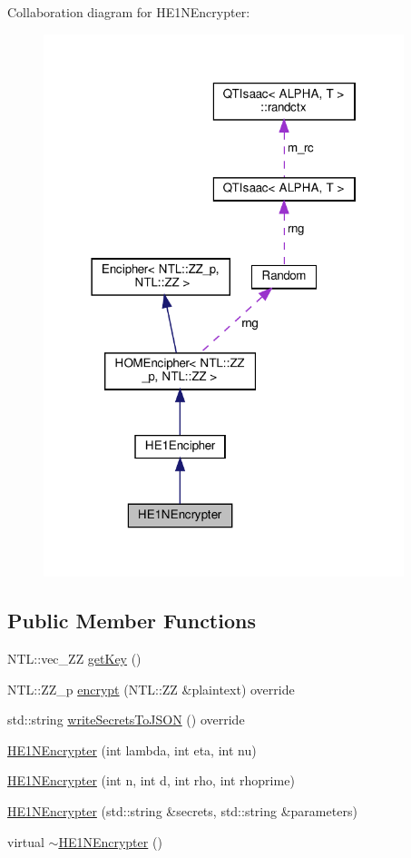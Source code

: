 Collaboration diagram for H\+E1\+N\+Encrypter\+:\nopagebreak
\begin{figure}[H]
\begin{center}
\leavevmode
\includegraphics[width=298pt]{classHE1NEncrypter__coll__graph}
\end{center}
\end{figure}
\subsection*{Public Member Functions}
\begin{DoxyCompactItemize}
\item 
N\+T\+L\+::vec\+\_\+\+ZZ \hyperlink{classHE1NEncrypter_a68735a56be50d13e04824e48a61fc2f8}{get\+Key} ()
\item 
N\+T\+L\+::\+Z\+Z\+\_\+p \hyperlink{classHE1NEncrypter_a9a9c76558466ac56093cb6da937c7fe3}{encrypt} (N\+T\+L\+::\+ZZ \&plaintext) override
\item 
std\+::string \hyperlink{classHE1NEncrypter_ad1bca3e0933b8e15b91d208e421f83b2}{write\+Secrets\+To\+J\+S\+ON} () override
\item 
\hyperlink{classHE1NEncrypter_ac8b2f33fc7d1cba481944b16072efab0}{H\+E1\+N\+Encrypter} (int lambda, int eta, int nu)
\item 
\hyperlink{classHE1NEncrypter_a744ec5a8d26d1877114d6bd679a9e9ed}{H\+E1\+N\+Encrypter} (int n, int d, int rho, int rhoprime)
\item 
\hyperlink{classHE1NEncrypter_ac8eae729be42e97261e0387540699b75}{H\+E1\+N\+Encrypter} (std\+::string \&secrets, std\+::string \&parameters)
\item 
virtual \hyperlink{classHE1NEncrypter_a995b560b8ae6270eb325b52b0073e86b}{$\sim$\+H\+E1\+N\+Encrypter} ()
\end{DoxyCompactItemize}
